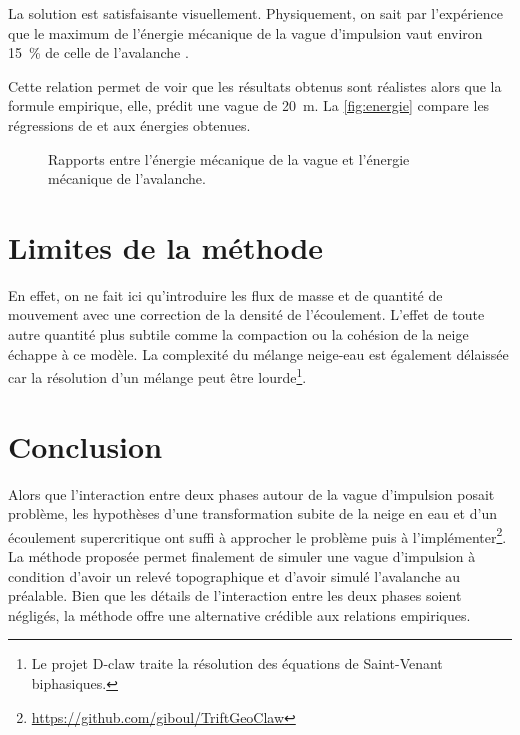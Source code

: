 La solution est satisfaisante visuellement.
Physiquement, on sait par l'expérience que le maximum de l'énergie mécanique de la vague d'impulsion vaut environ \SI{15}{\percent} de celle de l'avalanche \citep{zitti,zhenzu}.

Cette relation permet de voir que les résultats obtenus sont réalistes alors que la formule empirique, elle, prédit une vague de \SI{20}{\meter}.
La \autoref{fig:energie} compare les régressions de \cite{zitti} et \cite{zhenzu} aux énergies obtenues.

\begin{figure}
    \centering
    \resizebox{0.8\textwidth}{!}{}
    \caption{Rapports entre l'énergie mécanique de la vague et l'énergie mécanique de l'avalanche.}
    \label{fig:energie}
\end{figure}

\section{Limites de la méthode}

En effet, on ne fait ici qu'introduire les flux de masse et de quantité de mouvement avec une correction de la densité de l'écoulement. L'effet de toute autre quantité plus subtile comme la compaction \citep{kyburz}  ou la cohésion \citep{zhenzu}  de la neige échappe à ce modèle. La complexité du mélange neige-eau est également délaissée car la résolution d'un mélange peut être lourde\footnote{Le projet D-claw \citep{dclaw} traite la résolution des équations de Saint-Venant biphasiques.}.

\section{Conclusion}

Alors que l'interaction entre deux phases autour de la vague d'impulsion posait problème, les hypothèses d'une transformation subite de la neige en eau et d'un écoulement supercritique ont suffi à approcher le problème puis à l'implémenter\footnote{\href{https://github.com/giboul/TriftGeoClaw}{https://github.com/giboul/TriftGeoClaw}}. La méthode proposée permet finalement de simuler une vague d'impulsion à condition d'avoir un relevé topographique et d'avoir simulé l'avalanche au préalable. Bien que les détails de l'interaction entre les deux phases soient négligés, la méthode offre une alternative crédible aux relations empiriques.